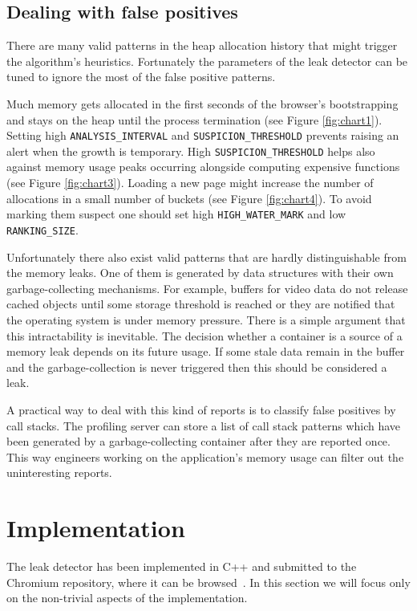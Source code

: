 \documentclass[preprint, numbers]{sigplanconf}
\begin{document}
\subsection{Dealing with false positives}
\label{sec:false}

There are many valid patterns in the heap allocation history that might trigger the algorithm's
heuristics.
Fortunately the parameters of the leak detector can be tuned to ignore the most of
the false positive patterns.

Much memory gets allocated in the first seconds of the browser's bootstrapping
and stays on the heap until the process termination (see Figure \ref{fig:chart1}).
Setting high \texttt{ANALYSIS\_INTERVAL} and \texttt{SUSPICION\_THRESHOLD}
prevents raising an alert when the growth is temporary.
High \texttt{SUSPICION\_THRESHOLD} helps also against memory usage peaks
occurring alongside computing expensive functions (see Figure \ref{fig:chart3}).
Loading a new page might increase the number of allocations in a small
number of buckets (see Figure \ref{fig:chart4}).
To avoid marking them suspect one should set high \texttt{HIGH\_WATER\_MARK}
and low \texttt{RANKING\_SIZE}.

Unfortunately there also exist valid patterns that are hardly distinguishable from
the memory leaks.
One of them is generated by data structures with their own garbage-collecting mechanisms.
For example, buffers for video data do not release cached objects until some storage threshold
is reached or they are notified that the operating system is under memory pressure.
There is a simple argument that this intractability is inevitable.
The decision whether a container is a source of a memory leak
depends on its future usage.
If some stale data remain in the buffer and the garbage-collection is never triggered
then this should be considered a leak.

A practical way to deal with this kind of reports is to
classify false positives by call stacks.
The profiling server can store a list of call stack patterns
which have been generated by a garbage-collecting container
after they are reported once.
This way engineers working on the application's memory usage
can filter out the uninteresting reports.

\section{Implementation}
The leak detector has been implemented in C++ and submitted to the Chromium repository, where
it can be browsed~\cite{chromium-leak}.
In this section we will focus only on the non-trivial aspects of the implementation.
\end{document}

